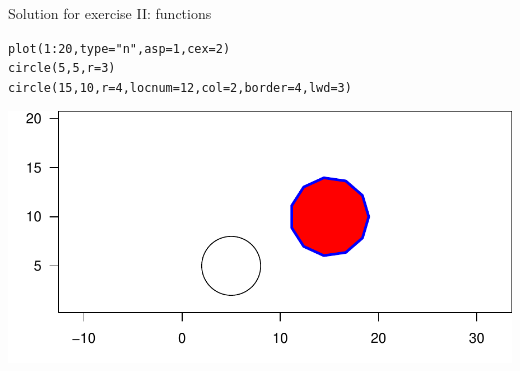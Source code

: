 \documentclass[xcolor=table,      handout ,    xcolor=dvipsnames]{beamer}\usepackage[]{graphicx}\usepackage[]{color}
\makeatletter
\newcommand{\hlnum}[1]{\textcolor[rgb]{0,0,0}{#1}}
\newcommand{\hlstr}[1]{\textcolor[rgb]{0.545,0.137,0.137}{#1}}
\newcommand{\hlopt}[1]{\textcolor[rgb]{0,0,0}{#1}}
\newcommand{\hlstd}[1]{\textcolor[rgb]{0,0,0}{#1}}
\newcommand{\hlkwc}[1]{\textcolor[rgb]{1,0,1}{#1}}
\newcommand{\hlkwd}[1]{\textcolor[rgb]{0,0,1}{#1}}
\newenvironment{kframe}{%
 \def\at@end@of@kframe{}%
 \ifinner\ifhmode%
  \def\at@end@of@kframe{\end{minipage}}%
  \begin{minipage}{\columnwidth}%
 \fi\fi%
 \def\FrameCommand##1{\hskip\@totalleftmargin \hskip-\fboxsep
 \colorbox{shadecolor}{##1}\hskip-\fboxsep
     \hskip-\linewidth \hskip-\@totalleftmargin \hskip\columnwidth}%
 \MakeFramed {\advance\hsize-\width
   \@totalleftmargin\z@ \linewidth\hsize
   \@setminipage}}%
 {\par\unskip\endMakeFramed%
 \at@end@of@kframe}
\newenvironment{knitrout}{}{} %
\newcounter{exercisecount}
\makeatother
\begin{document}

\begin{frame}[fragile]{Solution for exercise  II: functions}
\begin{knitrout}
\color{fgcolor}\begin{kframe}
\begin{alltt}
\hlkwd{plot}\hlstd{(}\hlnum{1}\hlopt{:}\hlnum{20}\hlstd{,} \hlkwc{type}\hlstd{=}\hlstr{"n"}\hlstd{,} \hlkwc{asp}\hlstd{=}\hlnum{1}\hlstd{,} \hlkwc{cex}\hlstd{=}\hlnum{2}\hlstd{)}
\hlkwd{circle}\hlstd{(}\hlnum{5}\hlstd{,}\hlnum{5}\hlstd{,} \hlkwc{r}\hlstd{=}\hlnum{3}\hlstd{)}
\hlkwd{circle}\hlstd{(}\hlnum{15}\hlstd{,}\hlnum{10}\hlstd{,} \hlkwc{r}\hlstd{=}\hlnum{4}\hlstd{,} \hlkwc{locnum}\hlstd{=}\hlnum{12}\hlstd{,} \hlkwc{col}\hlstd{=}\hlnum{2}\hlstd{,} \hlkwc{border}\hlstd{=}\hlnum{4}\hlstd{,} \hlkwc{lwd}\hlstd{=}\hlnum{3}\hlstd{)}
\end{alltt}
\end{kframe}

{\centering \includegraphics[width=\textwidth]{./fig/exfunsolb-1} 

}



\end{knitrout}
\end{frame}

\end{document}

